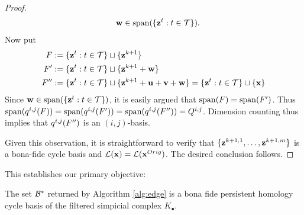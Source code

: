 \documentclass[utf8]{frontiers_suppmat} %
\begin{document}
\begin{proof}
\begin{align*}
        &&
        \mathbf{w} \in {\mathrm{span}}(\{\mathbf{z}^t : t \in \mathcal{T} \}).
    \end{align*}
Now put
    \begin{align*}
        F &: = \{\mathbf{z}^t : t \in \mathcal{T} \} \sqcup \{\mathbf{z}^{k+1}\}\\
        F' &: = \{\mathbf{z}^t : t \in \mathcal{T} \} \sqcup\{\mathbf{z}^{k+1} + \mathbf{w}\} \\
        F'' &: = \{\mathbf{z}^t : t \in \mathcal{T} \} \sqcup\{\mathbf{z}^{k+1} + \mathbf{u} + \mathbf{v} + \mathbf{w}\} =  \{\mathbf{z}^t : t \in \mathcal{T} \} \sqcup \{\mathbf{x}\}\\        
    \end{align*}
Since $\mathbf{w} \in {\mathrm{span}}(\{\mathbf{z}^t : t \in \mathcal{T} \})$, it is easily argued that ${\mathrm{span}}(F) = {\mathrm{span}}(F')$.  Thus ${\mathrm{span}}(q^{i, j}(F))={\mathrm{span}}(q^{i, j}(F'))={\mathrm{span}}(q^{i, j}(F'')) = Q^{i,j}$.  Dimension counting thus implies that $q^{i, j}(F'')$ is an $(i,j)$-basis.  
    
Given this observation, it is straightforward to verify that $\{\mathbf{z}^{k+1, 1}, \ldots, \mathbf{z}^{k+1, m} \}$ is a bona-fide cycle basis and $\mathcal{L}(\mathbf{x}) = \mathcal{L}(\mathbf{x}^{Orig})$.  The desired conclusion follows.
\end{proof}

This establishes our primary objective:

\begin{theorem}
The set $\mathcal B^*$ returned by Algorithm \ref{alg:edge} is a bona fide persistent homology cycle basis of the filtered simpicial complex $K_\bullet$.
\end{theorem}


\end{document}
